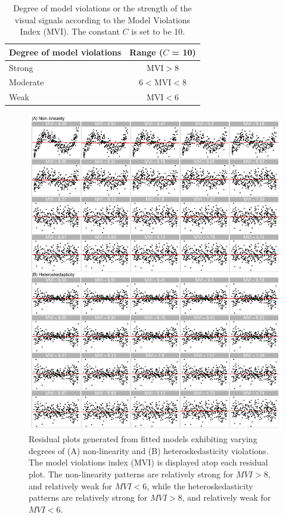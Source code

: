 \documentclass[]{interact}
\theoremstyle{plain}%
\theoremstyle{definition}
\theoremstyle{remark}
\begin{document}
\begin{table}

\caption{\label{tab:mvi}Degree of model violations or the strength of the visual signals according to the Model Violations Index (MVI). The constant $C$ is set to be 10.}
\centering
\begin{tabular}[t]{lc}
\toprule
Degree of model violations & Range ($C$ = 10)\\
\midrule
Strong & $\text{MVI} > 8$\\
Moderate & $6 < \text{MVI} < 8$\\
Weak & $\text{MVI} < 6$\\
\bottomrule
\end{tabular}
\end{table}

\begin{figure}[!h]

{\centering \includegraphics[width=1\linewidth]{paper_files/figure-latex/poly-heter-index-1} 

}

\caption{Residual plots generated from fitted models exhibiting varying degrees of (A) non-linearity and (B) heteroskedasticity violations. The model violations index (MVI) is displayed atop each residual plot. The non-linearity patterns are relatively strong for $MVI > 8$, and relatively weak for $MVI < 6$, while the heteroskedasticity patterns are relatively strong for $MVI > 8$, and relatively weak for $MVI < 6$.}\label{fig:poly-heter-index}
\end{figure}
\end{document}
